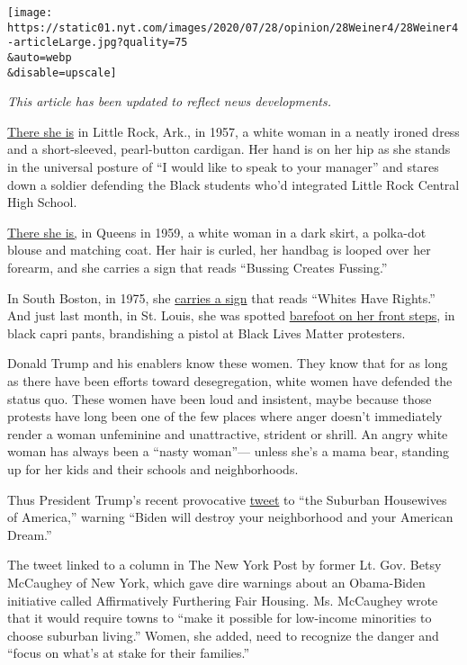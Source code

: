 \texttt{[image: https://static01.nyt.com/images/2020/07/28/opinion/28Weiner4/28Weiner4-articleLarge.jpg?quality=75\\\&auto=webp\\\&disable=upscale]}

\emph{This article has been updated to reflect news developments.}

\href{https://artsandculture.google.com/asset/little-rock-integration/jwEdz9Na2Fy0tQ}{There
she is} in Little Rock, Ark., in 1957, a white woman in a neatly ironed
dress and a short-sleeved, pearl-button cardigan. Her hand is on her hip
as she stands in the universal posture of ``I would like to speak to
your manager'' and stares down a soldier defending the Black students
who'd integrated Little Rock Central High School.

\href{https://images.app.goo.gl/KRH9N5YB1oSNuEum8}{There she is,} in
Queens in 1959, a white woman in a dark skirt, a polka-dot blouse and
matching coat. Her hair is curled, her handbag is looped over her
forearm, and she carries a sign that reads ``Bussing Creates Fussing.''

In South Boston, in 1975, she
\href{https://www.flickr.com/photos/boston_public_library/6326362205}{carries
a sign} that reads ``Whites Have Rights.'' And just last month, in St.
Louis, she was spotted
\href{https://www.washingtonpost.com/nation/2020/07/20/st-louis-couple-who-aimed-guns-protesters-charged-with-felony-weapons-count/}{barefoot
on her front steps}, in black capri pants, brandishing a pistol at Black
Lives Matter protesters.

Donald Trump and his enablers know these women. They know that for as
long as there have been efforts toward desegregation, white women have
defended the status quo. These women have been loud and insistent, maybe
because those protests have long been one of the few places where anger
doesn't immediately render a woman unfeminine and unattractive, strident
or shrill. An angry white woman has always been a ``nasty woman''---
unless she's a mama bear, standing up for her kids and their schools and
neighborhoods.

Thus President Trump's recent provocative
\href{https://twitter.com/realDonaldTrump/status/1286372175117791236?s=20}{tweet}
to ``the Suburban Housewives of America,'' warning ``Biden will destroy
your neighborhood and your American Dream.''

The tweet linked to a column in The New York Post by former Lt. Gov.
Betsy McCaughey of New York, which gave dire warnings about an
Obama-Biden initiative called Affirmatively Furthering Fair Housing. Ms.
McCaughey wrote that it would require towns to ``make it possible for
low-income minorities to choose suburban living.'' Women, she added,
need to recognize the danger and ``focus on what's at stake for their
families.''

